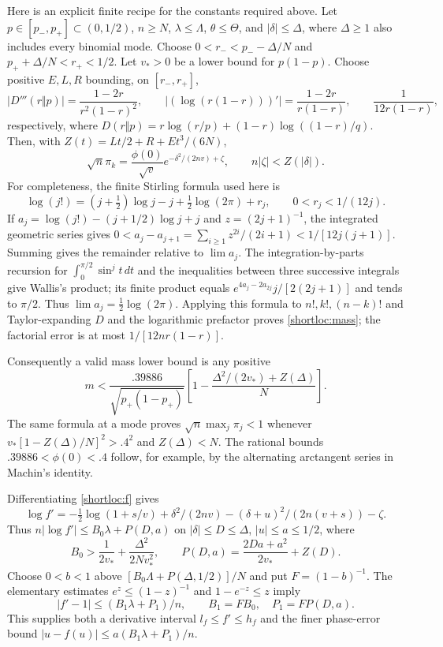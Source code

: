 Here is an explicit finite recipe for the constants required above.
Let $p\in[p_-,p_+]\subset(0,1/2)$, $n\ge N$, $\lambda\le\Lambda$,
$\theta\le\Theta$, and $|\delta|\le\Delta$, where $\Delta\ge1$ also includes
every binomial mode. Choose $0<r_-<p_- -\Delta/N$ and
$p_++\Delta/N<r_+<1/2$. Let $v_*>0$ be a lower bound for $p(1-p)$.
Choose positive $E,L,R$ bounding, on $[r_-,r_+]$,
\[
 |D'''(r\Vert p)|=\frac{1-2r}{r^2(1-r)^2},\qquad
 |(\log(r(1-r)))'|=\frac{1-2r}{r(1-r)},\qquad
 \frac1{12r(1-r)},
\]
respectively, where $D(r\Vert p)=r\log(r/p)+(1-r)\log((1-r)/q)$.
Then, with $Z(t)=Lt/2+R+Et^3/(6N)$,
\begin{equation}\label{shortloc:mass}
 \sqrt n\pi_k=\frac{\phi(0)}{\sqrt v}
       e^{-\delta^2/(2nv)+\zeta},\qquad n|\zeta|<Z(|\delta|).
\end{equation}
For completeness, the finite Stirling formula used here is
\[
 \log(j!)=(j+\tfrac12)\log j-j+\tfrac12\log(2\pi)+r_j,
 \qquad 0<r_j<1/(12j).
\]
If $a_j=\log(j!)-(j+1/2)\log j+j$ and $z=(2j+1)^{-1}$, the integrated
geometric series gives
$0<a_j-a_{j+1}=\sum_{i\ge1}z^{2i}/(2i+1)<1/[12j(j+1)]$.
Summing gives the remainder relative to $\lim a_j$. The integration-by-parts
recursion for $\int_0^{\pi/2}\sin^j t\,dt$ and the inequalities between three
successive integrals give Wallis's product; its finite product equals
$e^{4a_j-2a_{2j}}j/[2(2j+1)]$ and tends to $\pi/2$. Thus
$\lim a_j=\tfrac12\log(2\pi)$. Applying this formula to $n!,k!,(n-k)!$
and Taylor-expanding $D$ and the logarithmic prefactor proves
\eqref{shortloc:mass}; the factorial error is at most $1/[12nr(1-r)]$.

Consequently a valid mass lower bound is any positive
\begin{equation}\label{shortloc:m}
 m<\frac{.39886}{\sqrt{p_+(1-p_+)}}
          \left[1-\frac{\Delta^2/(2v_*)+Z(\Delta)}N\right].
\end{equation}
The same formula at a mode proves $\sqrt n\max_j\pi_j<1$ whenever
$v_*[1-Z(\Delta)/N]^2>.4^2$ and $Z(\Delta)<N$.
The rational bounds $.39886<\phi(0)<.4$ follow, for example, by the
alternating arctangent series in Machin's identity.

Differentiating \eqref{shortloc:f} gives
\begin{equation}\label{shortloc:logder}
 \log f'=-\tfrac12\log(1+s/v)+\delta^2/(2nv)
                   -(\delta+u)^2/(2n(v+s))-\zeta.
\end{equation}
Thus $n|\log f'|\le B_0\lambda+P(D,a)$ on $|\delta|\le D\le\Delta$,
$|u|\le a\le1/2$, where
\[
 B_0>\frac1{2v_*}+\frac{\Delta^2}{2Nv_*^2},\qquad
 P(D,a)=\frac{2Da+a^2}{2v_*}+Z(D).
\]
Choose $0<b<1$ above $[B_0\Lambda+P(\Delta,1/2)]/N$ and put
$F=(1-b)^{-1}$. The elementary estimates $e^z\le(1-z)^{-1}$ and
$1-e^{-z}\le z$ imply
\begin{equation}\label{shortloc:derivative}
 |f'-1|\le(B_1\lambda+P_1)/n,\qquad B_1=FB_0,\quad P_1=FP(D,a).
\end{equation}
This supplies both a derivative interval $l_f\le f'\le h_f$ and the
finer phase-error bound $|u-f(u)|\le a(B_1\lambda+P_1)/n$.

